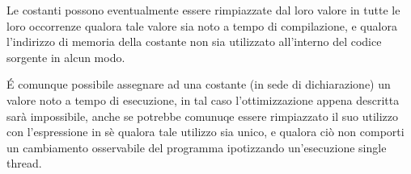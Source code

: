 \vspace{0.5cm}

Le costanti possono eventualmente essere rimpiazzate dal loro valore in tutte le loro occorrenze qualora tale valore sia noto a tempo di 
compilazione, e qualora l’indirizzo di memoria della costante non sia utilizzato all’interno del codice sorgente in alcun modo.

É comunque possibile assegnare ad una costante (in sede di dichiarazione) un valore noto a tempo di esecuzione, in tal caso 
l’ottimizzazione appena descritta sarà impossibile, anche se potrebbe comunuqe essere rimpiazzato il suo utilizzo con l’espressione 
in sè qualora tale utilizzo sia unico, e qualora ciò non comporti un cambiamento osservabile del programma ipotizzando un’esecuzione single thread.
